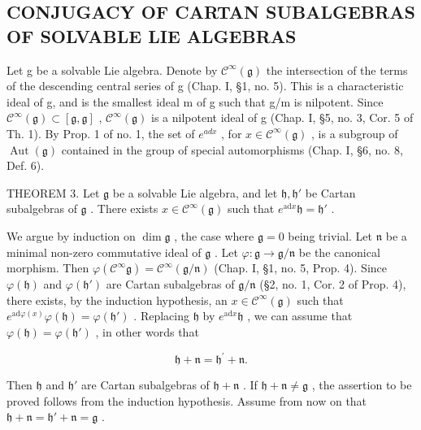 \subsection{CONJUGACY OF CARTAN SUBALGEBRAS OF SOLVABLE LIE ALGEBRAS}

Let g be a solvable Lie algebra. Denote by \(\mathcal{C}^{\infty}(\mathfrak{g})\) the intersection of the terms of the descending central series of g (Chap. I, §1, no. 5). This is a characteristic ideal of g, and is the smallest ideal m of g such that g/m is nilpotent. Since \(\mathcal{C}^{\infty}(\mathfrak{g}) \subset [\mathfrak{g}, \mathfrak{g}]\) , \(\mathcal{C}^{\infty}(\mathfrak{g})\) is a nilpotent ideal of g (Chap. I, §5, no. 3, Cor. 5 of Th. 1). By Prop. 1 of no. 1, the set of \(e^{ad x}\) , for \(x \in \mathcal{C}^{\infty}(\mathfrak{g})\) , is a subgroup of \(\operatorname{Aut}(\mathfrak{g})\) contained in the group of special automorphisms (Chap. I, §6, no. 8, Def. 6).

THEOREM 3. Let \(\mathfrak{g}\) be a solvable Lie algebra, and let \(\mathfrak{h},\mathfrak{h}'\) be Cartan subalgebras of \(\mathfrak{g}\) . There exists \(x\in \mathcal{C}^{\infty}(\mathfrak{g})\) such that \(e^{\mathrm{ad}x}\mathfrak{h} = \mathfrak{h}'\) .

We argue by induction on \(\dim \mathfrak{g}\) , the case where \(\mathfrak{g} = 0\) being trivial. Let \(\mathfrak{n}\) be a minimal non-zero commutative ideal of \(\mathfrak{g}\) . Let \(\varphi : \mathfrak{g} \to \mathfrak{g} / \mathfrak{n}\) be the canonical morphism. Then \(\varphi(\mathcal{C}^{\infty} \mathfrak{g}) = \mathcal{C}^{\infty}(\mathfrak{g} / \mathfrak{n})\) (Chap. I, §1, no. 5, Prop. 4). Since \(\varphi(\mathfrak{h})\) and \(\varphi(\mathfrak{h}')\) are Cartan subalgebras of \(\mathfrak{g} / \mathfrak{n}\) (§2, no. 1, Cor. 2 of Prop. 4), there exists, by the induction hypothesis, an \(x \in \mathcal{C}^{\infty}(\mathfrak{g})\) such that \(e^{\mathrm{ad} \varphi(x)}\varphi(\mathfrak{h}) = \varphi(\mathfrak{h}')\) . Replacing \(\mathfrak{h}\) by \(e^{\mathrm{ad} x}\mathfrak{h}\) , we can assume that \(\varphi(\mathfrak{h}) = \varphi(\mathfrak{h}')\) , in other words that

\[
\mathfrak {h} + \mathfrak {n} = \mathfrak {h} ^ {\prime} + \mathfrak {n}.
\]

Then \(\mathfrak{h}\) and \(\mathfrak{h}'\) are Cartan subalgebras of \(\mathfrak{h} + \mathfrak{n}\) . If \(\mathfrak{h} + \mathfrak{n} \neq \mathfrak{g}\) , the assertion to be proved follows from the induction hypothesis. Assume from now on that \(\mathfrak{h} + \mathfrak{n} = \mathfrak{h}' + \mathfrak{n} = \mathfrak{g}\) .

